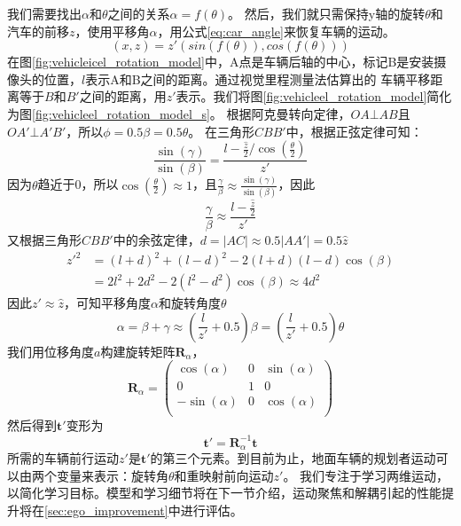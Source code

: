 我们需要找出$\alpha$和$\theta$之间的关系$\alpha=f(\theta)$。
然后，我们就只需保持y轴的旋转$\theta$和汽车的前移$z$，使用平移角$\alpha$，用公式\eqref{eq:car_angle}来恢复车辆的运动。
\begin{equation}
    (x,z) = z'(sin(f(\theta)),cos(f(\theta)))
    \label{eq:car_angle}
\end{equation}
在图\ref{fig:vehicleicel_rotation_model}中，A点是车辆后轴的中心，标记B是安装摄像头的位置，$l$表示A和B之间的距离。通过视觉里程测量法估算出的
车辆平移距离等于$B$和$B'$之间的距离，用{$z'$}表示。我们将图\ref{fig:vehicleel_rotation_model}简化为图\ref{fig:vehicleel_rotation_model_s}。
根据阿克曼转向定律\cite{siegwart2011introduction}，$OA \bot AB$且$OA' \bot A'B'$，所以$\phi = 0.5 \beta = 0.5 \theta$。
在三角形$CBB'$中，根据正弦定律可知：
{
\begin{equation}
   \frac{\sin(\gamma)}{\sin(\beta)}  = \frac{l-\frac{\hat{z}}{2} / \cos(\frac{\theta}{2})}{z'} 
\end{equation}}
因为$\theta$趋近于0，所以$\cos(\frac{\theta}{2}) \approx 1$，且$ \frac{\gamma}{\beta} \approx  \frac{\sin(\gamma)}{\sin(\beta)} $，因此
{
\begin{equation}
    \frac{\gamma}{\beta}  \approx \frac{l-\frac{\hat{z}}{2}}{z'} 
\end{equation}}
又根据三角形$CBB'$中的余弦定律，{$d = |AC| \approx 0.5|AA'| =0.5\hat{z}$}
{
\begin{equation}
    \begin{split}
        z'^2 &= (l+d)^2 + (l-d)^2- 2(l+d)(l-d)\cos(\beta) \\
        &= 2l^2+2d^2 - 2(l^2-d^2)\cos(\beta)\approx 4d^2
    \end{split}
\end{equation}
}
因此$z'\approx \hat{z}$，可知平移角度$\alpha$和旋转角度$\theta$
{
\begin{equation}
    \alpha = \beta + \gamma \approx (\frac{l}{z'}+0.5)\beta =(\frac{l}{z'}+0.5)\theta
    \label{eq:r_t_ratio}
\end{equation}}
我们用位移角度$a$构建旋转矩阵$\mathbf{R}_\alpha$，
\begin{equation}
    \mathbf{R}_\alpha = \begin{pmatrix}
        \cos(\alpha)& 0 & \sin(\alpha)\\ 
        0 & 1 & 0\\ 
        -\sin(\alpha)& 0 & \cos(\alpha)\\ 
    \end{pmatrix} 
    \label{eq:r_alpha}
\end{equation}
然后得到$\mathbf{t}'$变形为
\begin{equation}
    \mathbf{t}' = \mathbf{R}_\alpha^{-1}\mathbf{t}
    \label{eq:decouple_z}
\end{equation}
所需的车辆前行运动{$z'$}是$\mathbf{t}'$的第三个元素。到目前为止，地面车辆的规划者运动可以由两个变量来表示：旋转角$\theta$和重映射前向运动$z'$。
我们专注于学习两维运动，以简化学习目标。模型和学习细节将在下一节介绍，运动聚焦和解耦引起的性能提升将在\ref{sec:ego_improvement}中进行评估。

